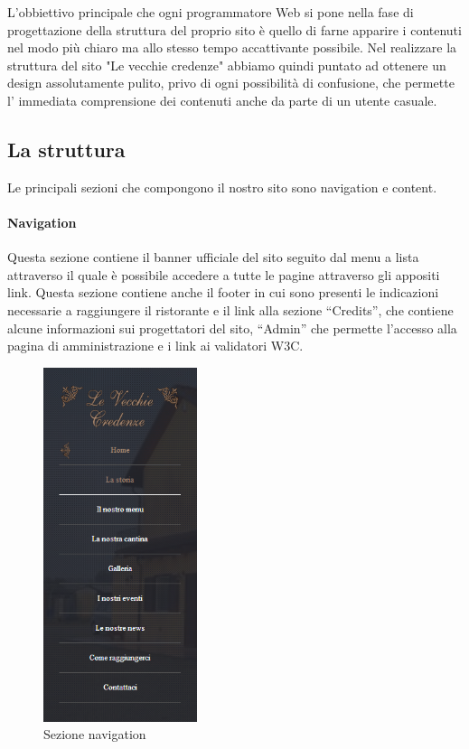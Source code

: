 L’obbiettivo principale che ogni programmatore Web si pone nella fase di progettazione della struttura del proprio sito è quello di farne apparire i contenuti nel modo più chiaro ma allo stesso tempo accattivante possibile. Nel realizzare la struttura del sito "Le vecchie credenze" abbiamo quindi puntato ad ottenere un design assolutamente pulito, privo di ogni possibilità di confusione, che permette l' immediata comprensione dei contenuti anche da parte di un utente casuale. 

\subsection{La struttura}
Le principali sezioni che compongono il nostro sito sono  navigation e content.

\paragraph{Navigation}

Questa sezione contiene il banner ufficiale del sito seguito dal menu a lista attraverso il quale è possibile accedere a tutte le pagine attraverso gli appositi link. Questa sezione contiene anche il footer in cui sono presenti le indicazioni necessarie a raggiungere il ristorante e il link alla sezione “Credits”, che contiene alcune informazioni sui progettatori del sito, “Admin” che permette l’accesso alla pagina di amministrazione e i link ai validatori W3C.


\begin{figure}[H]
		\centering \includegraphics[width=0.4\textwidth]{images/navigation.png}
		\caption{Sezione navigation}
\end{figure}

